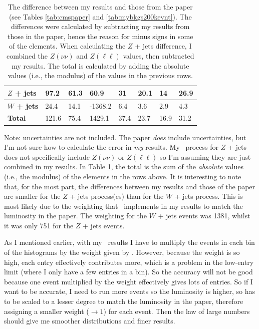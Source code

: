 \begin{table}[H]
\begin{tabular}{|l|lllllll|}
    \textbf{$Z$ + jets}  & 97.2    & 61.3    & 60.9    & 31      & 20.1     & 14        & 26.9    \\ \hline
    \textbf{$W$ + jets} & 24.4    & 14.1    & -1368.2     & 6.4     & 3.6      & 2.9       & 4.3     \\ \hline
    \textbf{Total}        & 121.6 & 75.4  & 1429.1   & 37.4  & 23.7   & 16.9    & 31.2  \\ \hline
    \end{tabular}
    \caption{The difference between my results and those from the paper (see Tables \ref{tab:cmspaper} and \ref{tab:mybkgs200kevnt}). The differences were calculated by subtracting my results from those in the paper, hence the reason for minus signs in some of the elements. When calculating the $Z$ + jets difference, I combined the $Z(\nu\nu)$ and $Z(\ell\ell)$ values, then subtracted my results. The total is calculated by adding the absolute values (i.e., the modulus) of the values in the previous rows.}
    \label{tab:diff-mine-cms}
\end{table}

Note: uncertainties are not included. The paper \emph{does} include uncertainties, but I'm not sure how to calculate the error in \emph{my} results. My \madgraph\ process for $Z$ + jets does not specifically include $Z(\nu\nu)$ or $Z(\ell\ell)$ so I'm assuming they are just combined in my results. In Table \ref{tab:diff-mine-cms}, the total is the sum of the \emph{absolute} values (i.e., the modulus) of the elements in the rows above. It is interesting to note that, for the most part, the differences between my results and those of the paper are smaller for the $Z$ + jets process(es) than for the $W$ + jets process. This is most likely due to the weighting that \madanalysis\ implements in my results to match the luminosity in the paper. The weighting for the $W$ + jets events was 1381, whilst it was only 751 for the $Z$ + jets events.

As I mentioned earlier, with my \madgraph\ results I have to multiply the events in each bin of the histograms by the weight given by \madanalysis. However, because the weight is so high, each entry effectively contributes more, which is a problem in the low-entry limit (where I only have a few entries in a bin). So the accuracy will not be good because one event multiplied by the weight effectively gives lots of entries. So if I want to be accurate, I need to run more events so the luminosity is higher, so has to be scaled to a lesser degree to match the luminosity in the paper, therefore assigning a smaller weight ($\rightarrow 1$) for each event. Then the law of large numbers should give me smoother distributions and finer results.

